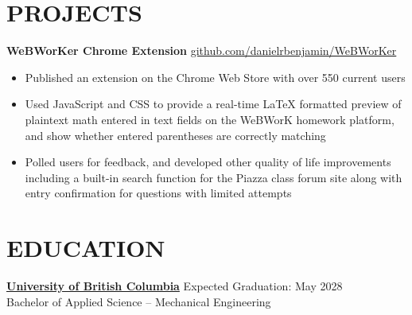 \documentclass[11pt]{article}       %
\begin{document}
\vspace{-18.5pt}

\section*{PROJECTS}
\textbf{WeBWorKer Chrome Extension} \hfill \href{https://github.com/danielrbenjamin/WeBWorKer}{github.com/danielrbenjamin/WeBWorKer} \\
\vspace{-9pt}
\begin{itemize}
  \item Published an extension on the Chrome Web Store with over 550 current users
  \item Used JavaScript and CSS to provide a real-time LaTeX formatted preview of plaintext math entered in text fields on the WeBWorK homework platform, and show whether entered parentheses are correctly matching
  \item Polled users for feedback, and developed other quality of life improvements including a built-in search function for the Piazza class forum site along with entry confirmation for questions with limited attempts
\end{itemize}

\vspace{-6.5pt}

\section*{EDUCATION}
\textbf{\href{https://apsc.ubc.ca/}{University of British Columbia}} \hfill Expected Graduation: May 2028
\\Bachelor of Applied Science – Mechanical Engineering



\end{document}
